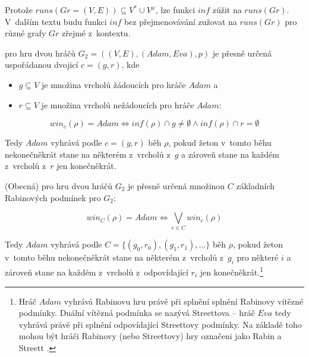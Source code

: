 Protože $runs(Gr = (V, E)) \subseteq V^* \cup V^\omega$, lze funkci $inf$ zúžit na $runs(Gr)$. V~dalším textu budu funkci $inf$ bez přejmenovávání zužovat na $runs(Gr)$ pro různé grafy $Gr$ zřejmé z~kontextu.
\begin{definition}
 pro hru dvou hráčů $G_2 = ((V, E), (Adam, Eva), p)$ je přesně určená uspořádanou dvojicí $c = (g, r)$, kde
\begin{itemize}
\item $g \subseteq V$ je množina vrcholů žádoucích pro hráče $Adam$ a
\item $r \subseteq V$ je množina vrcholů nežádoucích pro hráče $Adam$:
\end{itemize}

\begin{equation}
win_c(\rho) = Adam \Leftrightarrow inf(\rho) \cap g \neq \emptyset \wedge inf(\rho) \cap r = \emptyset
\end{equation}
\end{definition}
\begin{informal}
Tedy $Adam$ vyhrává podle $c = (g, r)$ běh $\rho$, pokud žeton v~tomto běhu nekonečněkrát stane na některém z~vrcholů z~$g$ a zároveň stane na každém z~vrcholů z~$r$ jen konečněkrát.
\end{informal}
\begin{definition} \label{def:rabinwinningcondition}
(Obecná)  pro hru dvou hráčů $G_2$ je přesně určená množinou $C$ základních Rabinových podmínek pro $G_2$:

\begin{equation}
win_C(\rho) = Adam \Leftrightarrow \bigvee_{c \in C} win_c(\rho)
\end{equation}
\end{definition}
\begin{informal}
Tedy $Adam$ vyhrává podle $C = \{(g_0, r_0), (g_1, r_1), \dotsc\}$ běh $\rho$, pokud žeton v~tomto běhu nekonečněkrát stane na některém z~vrcholů z~$g_i$ pro některé $i$ a zároveň stane na každém z~vrcholů z~odpovídající $r_i$ jen konečněkrát.\footnote{Hráč $Adam$ vyhrává Rabinovu hru právě při splnění splnění Rabinovy vítězné podmínky. Duální vítězná podmínka se nazývá Streettova \cite[s.~2]{Piterman2006} -- hráč $Eva$ tedy vyhrává právě při splnění odpovídající Streettovy podmínky. Na základě toho mohou být hráči Rabinovy (nebo Streettovy) hry označeni jako Rabin a Streett \cite[s.~2]{Piterman2006}.}
\end{informal}

